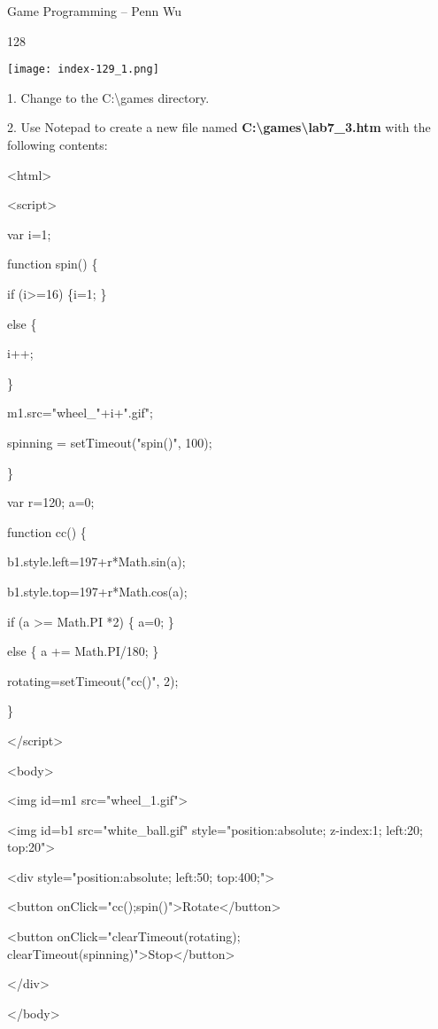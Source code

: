 \documentclass[
]{article}
\begin{document}
Game Programming -- Penn Wu

128

\protect\hypertarget{index_split_008.htmlux5cux23p129}{}{}\texttt{[image: index-129\_1.png]}

1. Change to the C:\textbackslash games directory.

2. Use Notepad to create a new file named
\textbf{C:\textbackslash games\textbackslash lab7\_3.htm} with the
following contents:

\textless html\textgreater{}

\textless script\textgreater{}

var i=1;

function spin() \{

if (i\textgreater=16) \{i=1; \}

else \{

i++;

\}

m1.src="wheel\_"+i+".gif";

spinning = setTimeout("spin()", 100);

\}

var r=120; a=0;

function cc() \{

b1.style.left=197+r*Math.sin(a);

b1.style.top=197+r*Math.cos(a);

if (a \textgreater= Math.PI *2) \{ a=0; \}

else \{ a += Math.PI/180; \}

rotating=setTimeout("cc()", 2);

\}

\textless/script\textgreater{}

\textless body\textgreater{}

\textless img id=m1 src="wheel\_1.gif"\textgreater{}

\textless img id=b1 src="white\_ball.gif" style="position:absolute;
z-index:1; left:20; top:20"\textgreater{}

\textless div style="position:absolute; left:50; top:400;"\textgreater{}

\textless button
onClick="cc();spin()"\textgreater Rotate\textless/button\textgreater{}

\textless button onClick="clearTimeout(rotating);
clearTimeout(spinning)"\textgreater Stop\textless/button\textgreater{}

\textless/div\textgreater{}

\textless/body\textgreater{}
\end{document}
